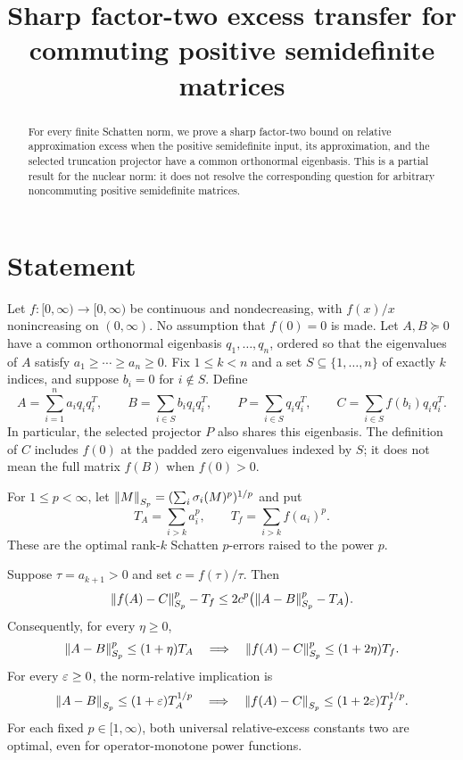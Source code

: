 \documentclass[11pt]{article}
\title{Sharp factor-two excess transfer for commuting positive semidefinite matrices}
\author{}
\date{}
\begin{document}
\maketitle

\begin{abstract}
For every finite Schatten norm, we prove a sharp factor-two bound on relative approximation excess when the positive semidefinite input, its approximation, and the selected truncation projector have a common orthonormal eigenbasis. This is a partial result for the nuclear norm: it does not resolve the corresponding question for arbitrary noncommuting positive semidefinite matrices.
\end{abstract}

\section{Statement}
Let $f:[0,\infty)\to[0,\infty)$ be continuous and nondecreasing, with $f(x)/x$ nonincreasing on $(0,\infty)$. No assumption that $f(0)=0$ is made.
Let $A,B\succeq0$ have a common orthonormal eigenbasis $q_1,\ldots,q_n$, ordered so that the eigenvalues of $A$ satisfy $a_1\ge\cdots\ge a_n\ge0$. Fix $1\le k<n$ and a set $S\subseteq\{1,\ldots,n\}$ of exactly $k$ indices, and suppose $b_i=0$ for $i\notin S$. Define
\[
 A=\sum_{i=1}^n a_iq_iq_i^T,\qquad
 B=\sum_{i\in S}b_iq_iq_i^T,\qquad
 P=\sum_{i\in S}q_iq_i^T,\qquad
 C=\sum_{i\in S}f(b_i)q_iq_i^T.
\]
In particular, the selected projector $P$ also shares this eigenbasis. The definition of $C$ includes $f(0)$ at the padded zero eigenvalues indexed by $S$; it does not mean the full matrix $f(B)$ when $f(0)>0$.

For $1\le p<\infty$, let $\left\lVert M\right\rVert_{S_p}=(\sum_i\sigma_i(M)^p)^{1/p}$ and put
\[
 T_A=\sum_{i>k}a_i^p,\qquad
 T_f=\sum_{i>k}f(a_i)^p.
\]
These are the optimal rank-$k$ Schatten $p$-errors raised to the power $p$.

\begin{theorem}\label{thm:commuting}
Suppose $\tau=a_{k+1}>0$ and set $c=f(\tau)/\tau$. Then
\[
 \left\lVert f(A)-C\right\rVert_{S_p}^p-T_f
 \le 2c^p\bigl(\left\lVert A-B\right\rVert_{S_p}^p-T_A\bigr).
\]
Consequently, for every $\eta\ge0$,
\[
 \left\lVert A-B\right\rVert_{S_p}^p\le(1+\eta)T_A
 \quad\Longrightarrow\quad
 \left\lVert f(A)-C\right\rVert_{S_p}^p\le(1+2\eta)T_f.
\]
For every $\varepsilon\ge0$, the norm-relative implication is
\[
 \left\lVert A-B\right\rVert_{S_p}\le(1+\varepsilon)T_A^{1/p}
 \quad\Longrightarrow\quad
 \left\lVert f(A)-C\right\rVert_{S_p}\le(1+2\varepsilon)T_f^{1/p}.
\]
For each fixed $p\in[1,\infty)$, both universal relative-excess constants two are optimal, even for operator-monotone power functions.
\end{theorem}
\end{document}
